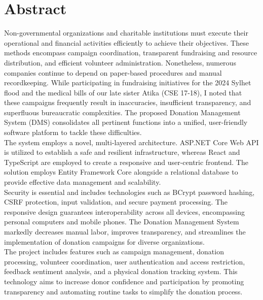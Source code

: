 \chapter*{Abstract}
Non-governmental organizations and charitable institutions must execute their operational and financial activities efficiently to achieve their objectives. These methods encompass campaign coordination, transparent fundraising and resource distribution, and efficient volunteer administration. Nonetheless, numerous companies continue to depend on paper-based procedures and manual recordkeeping. While participating in fundraising initiatives for the 2024 Sylhet flood and the medical bills of our late sister Atika (CSE 17-18), I noted that these campaigns frequently result in inaccuracies, insufficient transparency, and superfluous bureaucratic complexities. The proposed Donation Management System (DMS) consolidates all pertinent functions into a unified, user-friendly software platform to tackle these difficulties.
\\
The system employs a novel, multi-layered architecture. ASP.NET Core Web API is utilized to establish a safe and resilient infrastructure, whereas React and TypeScript are employed to create a responsive and user-centric frontend. The solution employs Entity Framework Core alongside a relational database to provide effective data management and scalability.
\\
Security is essential and includes technologies such as BCrypt password hashing, CSRF protection, input validation, and secure payment processing. The responsive design guarantees interoperability across all devices, encompassing personal computers and mobile phones. The Donation Management System markedly decreases manual labor, improves transparency, and streamlines the implementation of donation campaigns for diverse organizations.
\\
The project includes features such as campaign management, donation processing, volunteer coordination, user authentication and access restriction, feedback sentiment analysis, and a physical donation tracking system. This technology aims to increase donor confidence and participation by promoting transparency and automating routine tasks to simplify the donation process. 

 
\\

\newpage
{}

\newpage
